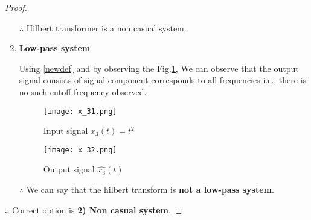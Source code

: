\documentclass[journal,12pt,twocolumn]{IEEEtran}
\begin{document}
\begin{proof}
\begin{enumerate}
$\therefore$ Hilbert transformer is a non casual system.


\item {\textbf{\underline{Low-pass system}}}

Using \eqref{newdef} and by observing the Fig.\ref{figx3}, We can observe that the output signal consists of signal component corresponds to all frequencies i.e., there is no such cutoff frequency observed. 

  \begin{figure}[!htp]
\centering
 \texttt{[image: x\_31.png]}
 \caption{Input signal $x_3(t)=t^2$}
 \end{figure}
 
  \begin{figure}[!htp]
\centering
 \texttt{[image: x\_32.png]}
 \caption{Output signal $\hat{x_3}(t)$}
 \label{figx3}
 \end{figure}

\newpage
$\therefore$ We can say that the hilbert transform is \textbf{not a low-pass system}.
\end{enumerate}

$\therefore$ Correct option is \textbf{2) Non casual system}.
\end{proof}
\end{document}
